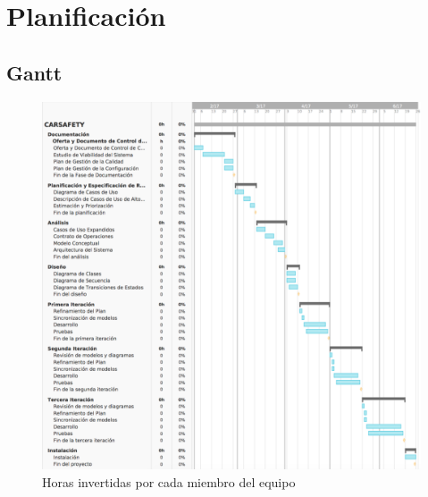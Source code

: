 \section{Planificación}
\subsection{Gantt}
\par {}
\begin{figure}[H]
\begin{center}
\includegraphics[width=1\textwidth]{./img/gannt.png}
\end{center}
\caption{Horas invertidas por cada miembro del equipo}
\label{tab:horasMiembro}
\end{figure}
\pagebreak
